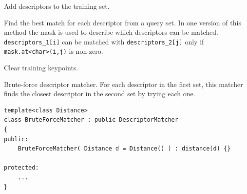 Add descriptors to the training set.


\begin{description}
\end{description}

Find the best match for each descriptor from a query set. In one version 
of this method the mask is used to describe which descriptors can be matched.
\texttt{descriptors\_1[i]} can be matched with \texttt{descriptors\_2[j]} only if \texttt{mask.at<char>(i,j)} is non-zero.


\begin{description}
\end{description}

Clear training keypoints.


Brute-force descriptor matcher. For each descriptor in the first set, this matcher finds the closest
descriptor in the second set by trying each one.

\begin{lstlisting}
template<class Distance>
class BruteForceMatcher : public DescriptorMatcher
{
public:
    BruteForceMatcher( Distance d = Distance() ) : distance(d) {}

protected:
    ...
}
\end{lstlisting}

